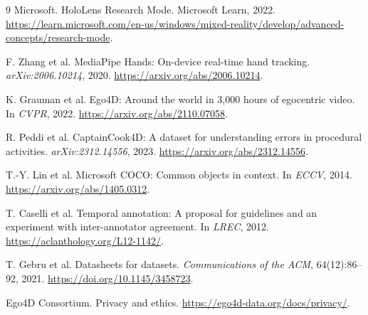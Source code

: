 \documentclass[10pt]{article}
\begin{document}
\begin{thebibliography}{9}
Microsoft. \newblock HoloLens Research Mode. \newblock Microsoft Learn, 2022.
\newblock \url{https://learn.microsoft.com/en-us/windows/mixed-reality/develop/advanced-concepts/research-mode}.

F. Zhang et al. \newblock MediaPipe Hands: On-device real-time hand tracking.
\newblock \emph{arXiv:2006.10214}, 2020.
\newblock \url{https://arxiv.org/abs/2006.10214}.

K. Grauman et al. \newblock Ego4D: Around the world in 3,000 hours of egocentric
video. \newblock In \emph{CVPR}, 2022.
\newblock \url{https://arxiv.org/abs/2110.07058}.

R. Peddi et al. \newblock CaptainCook4D: A dataset for understanding errors in
procedural activities. \newblock \emph{arXiv:2312.14556}, 2023.
\newblock \url{https://arxiv.org/abs/2312.14556}.

T.-Y. Lin et al. \newblock Microsoft COCO: Common objects in context.
\newblock In \emph{ECCV}, 2014. \newblock \url{https://arxiv.org/abs/1405.0312}.

T. Caselli et al. \newblock Temporal annotation: A proposal for guidelines and
an experiment with inter-annotator agreement. \newblock In \emph{LREC}, 2012.
\newblock \url{https://aclanthology.org/L12-1142/}.

T. Gebru et al. \newblock Datasheets for datasets.
\newblock \emph{Communications of the ACM}, 64(12):86--92, 2021.
\newblock \url{https://doi.org/10.1145/3458723}.

Ego4D Consortium. \newblock Privacy and ethics.
\newblock \url{https://ego4d-data.org/docs/privacy/}.
\end{thebibliography}
\end{document}
